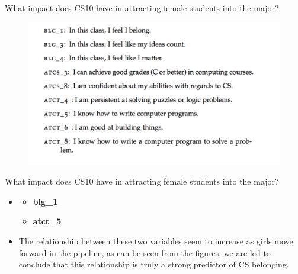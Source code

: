 \documentclass{beamer}                  %
\begin{document}
\begin{frame}{What impact does CS10 have in attracting female students into the major?}

  \begin{figure}[!htbp]
      \centering
      \includegraphics[width=1\textwidth]{BLG-ATCT}
      
  \end{figure}

\end{frame}

\begin{frame}{What impact does CS10 have in attracting female students into the major?}

  \begin{itemize}
  \item 
    \begin{itemize}
      \item \textbf{blg\_1}
      \item \textbf{atct\_5}
    \end{itemize}
  \item The relationship between these two variables seem to increase as girls move forward in the pipeline, as can be seen from the figures,  we are led to conclude that this relationship is truly a strong predictor of CS belonging.
  \end{itemize}

\end{frame}
\end{document}
